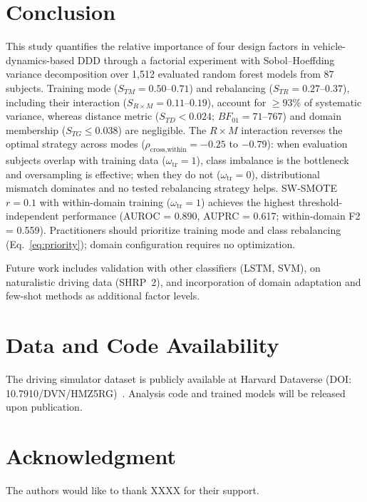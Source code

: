\documentclass[lettersize,journal]{IEEEtran}
\begin{document}
\section{Conclusion}
\label{sec:conclusion}
This study quantifies the relative importance of four design factors in vehicle-dynamics-based DDD through a factorial experiment with Sobol--Hoeffding variance decomposition over 1,512 evaluated random forest models from 87 subjects.
Training mode ($S_{TM} = 0.50$--$0.71$) and rebalancing ($S_{TR} = 0.27$--$0.37$), including their interaction ($S_{R \times M} = 0.11$--$0.19$), account for $\geq 93$\% of systematic variance, whereas distance metric ($S_{TD} < 0.024$; $BF_{01} = 71$--$767$) and domain membership ($S_{TG} \leq 0.038$) are negligible.
The $R \times M$ interaction reverses the optimal strategy across modes ($\rho_{\text{cross,within}} = -0.25$ to $-0.79$): when evaluation subjects overlap with training data ($\omega_{\mathrm{tr}} = 1$), class imbalance is the bottleneck and oversampling is effective; when they do not ($\omega_{\mathrm{tr}} = 0$), distributional mismatch dominates and no tested rebalancing strategy helps.
SW-SMOTE $r{=}0.1$ with within-domain training ($\omega_{\mathrm{tr}} = 1$) achieves the highest threshold-independent performance (AUROC = 0.890, AUPRC = 0.617; within-domain F2 = 0.559).
Practitioners should prioritize training mode and class rebalancing (Eq.~\eqref{eq:priority}); domain configuration requires no optimization.

Future work includes validation with other classifiers (LSTM, SVM), on naturalistic driving data (SHRP~2), and incorporation of domain adaptation and few-shot methods as additional factor levels.

\section*{Data and Code Availability}
The driving simulator dataset is publicly available at Harvard Dataverse (DOI: 10.7910/DVN/HMZ5RG)~\cite{aygun2024}.
Analysis code and trained models will be released upon publication.

\section*{Acknowledgment}
The authors would like to thank XXXX for their support.




\vspace{11pt}
\end{document}
